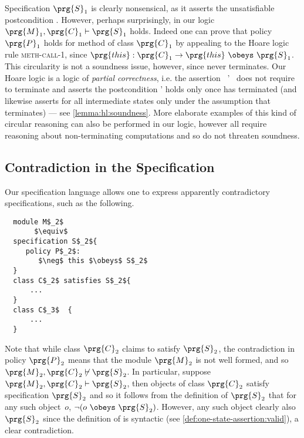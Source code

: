 Specification $\prg{S}_1$ is clearly nonsensical, as it asserts the
unsatisfiable postcondition . However, perhaps surprisingly,
in our logic
$\prg{M}_1, \prg{C}_1 \vdash \prg{S}_1$ holds. Indeed one can prove that policy
$\prg{P}_1$ holds for method  of class $\prg{C}_1$ by appealing to
the Hoare logic rule \textsc{meth-call-1}, 
since $\prg{this} : \prg{C}_1 \rightarrow \prg{this}\  \obeys\  \prg{S}_1$.  This circularity is not
a soundness issue, however, since  never terminates.
Our Hoare logic is a logic of \emph{partial correctness}, i.e. the assertion
\mbox{\HoareExpl{\A} {} {\M} {\B'} {\B}} does not require
 to terminate and asserts  the postcondition \B' holds only once
 has terminated (and likewise asserts {\B} for all intermediate
states only under the assumption that  terminates) --- see
\autoref{lemma:hl:soundness}. More elaborate examples of this kind of
circular reasoning can also
be performed in our logic, however all require reasoning about non-terminating
computations and so do not threaten soundness.

\subsection{Contradiction in the Specification}

Our specification language allows one to express apparently contradictory
specifications, such as the following.

 \begin{lstlisting}
  module M$_2$
       $\equiv$
  specification S$_2${
     policy P$_2$:
        $\neg$ this $\obeys$ S$_2$
  }
  class C$_2$ satisfies S$_2${
      ...
  }
  class C$_3$  {
      ...
  }
\end{lstlisting}

Note that while class $\prg{C}_2$ claims to satisfy $\prg{S}_2$, the
contradiction in policy $\prg{P}_2$ means that the module $\prg{M}_2$
is not well formed, and so
$\prg{M}_2, \prg{C}_2 \not\vdash \prg{S}_2$. In particular, suppose
$\prg{M}_2, \prg{C}_2 \vdash \prg{S}_2$, then objects of
class $\prg{C}_2$ satisfy specification $\prg{S}_2$ and so it follows
from the definition of $\prg{S}_2$
that for any such object~$o$, $\lnot (o\ \obeys\ \prg{S}_2)$.
However, any such object clearly
also {\obeys} $\prg{S}_2$ since the definition of {\obeys} is syntactic
(see \autoref{def:one-state-assertion:valid}), a clear contradiction.

